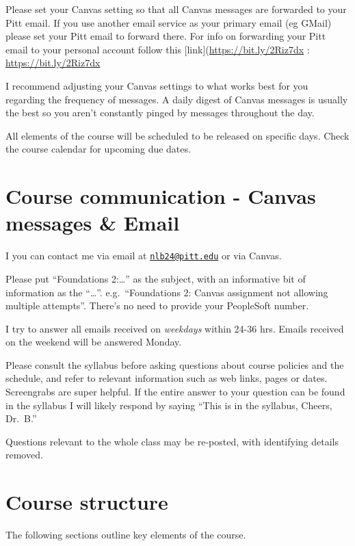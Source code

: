 \documentclass[
]{book}
\begin{document}
Please set your Canvas setting so that all Canvas messages are forwarded to your Pitt email. If you use another email service as your primary email (eg GMail) please set your Pitt email to forward there.
For info on forwarding your Pitt email to your personal account follow this {[}link{]}(\url{https://bit.ly/2Riz7dx} : \url{https://bit.ly/2Riz7dx}

I recommend adjusting your Canvas settings to what works best for you regarding the frequency of messages. A daily digest of Canvas messages is usually the best so you aren't constantly pinged by messages throughout the day.

All elements of the course will be scheduled to be released on specific days. Check the course calendar for upcoming due dates.

\hypertarget{course-communication---canvas-messages-email}{%
\chapter{Course communication - Canvas messages \& Email}\label{course-communication---canvas-messages-email}}

I you can contact me via email at \href{mailto:nlb24@pitt.edu}{\nolinkurl{nlb24@pitt.edu}} or via Canvas.

Please put ``Foundations 2:\ldots{}'' as the subject, with an informative bit of information as the ``\ldots{}''. e.g.~``Foundations 2: Canvas assignment not allowing multiple attempts''. There's no need to provide your PeopleSoft number.

I try to answer all emails received on \emph{weekdays} within 24-36 hrs. Emails received on the weekend will be answered Monday.

Please consult the syllabus before asking questions about course policies and the schedule, and refer to relevant information such as web links, pages or dates. Screengrabs are super helpful. If the entire answer to your question can be found in the syllabus I will likely respond by saying ``This is in the syllabus, Cheers, Dr.~B.''

Questions relevant to the whole class may be re-posted, with identifying details removed.

\hypertarget{course-structure}{%
\chapter{Course structure}\label{course-structure}}

The following sections outline key elements of the course.
\end{document}
